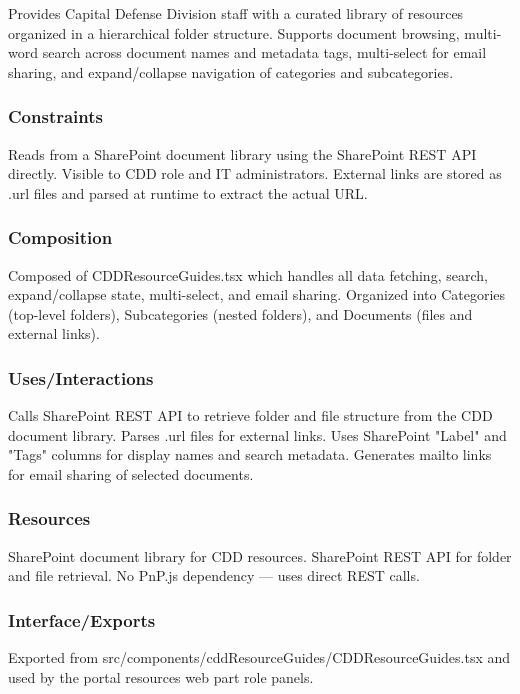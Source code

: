 \documentclass[12pt]{article}
\begin{document}
Provides Capital Defense Division staff with a curated library of resources organized in a hierarchical folder structure. Supports document browsing, multi-word search across document names and metadata tags, multi-select for email sharing, and expand/collapse navigation of categories and subcategories.

\subsubsection{Constraints}

Reads from a SharePoint document library using the SharePoint REST API directly. Visible to CDD role and IT administrators. External links are stored as .url files and parsed at runtime to extract the actual URL.

\subsubsection{Composition}

Composed of CDDResourceGuides.tsx which handles all data fetching, search, expand/collapse state, multi-select, and email sharing. Organized into Categories (top-level folders), Subcategories (nested folders), and Documents (files and external links).

\subsubsection{Uses/Interactions}

Calls SharePoint REST API to retrieve folder and file structure from the CDD document library. Parses .url files for external links. Uses SharePoint "Label" and "Tags" columns for display names and search metadata. Generates mailto links for email sharing of selected documents.

\subsubsection{Resources}

SharePoint document library for CDD resources. SharePoint REST API for folder and file retrieval. No PnP.js dependency --- uses direct REST calls.

\subsubsection{Interface/Exports}

Exported from src/components/cddResourceGuides/CDDResourceGuides.tsx and used by the portal resources web part role panels.
\end{document}
